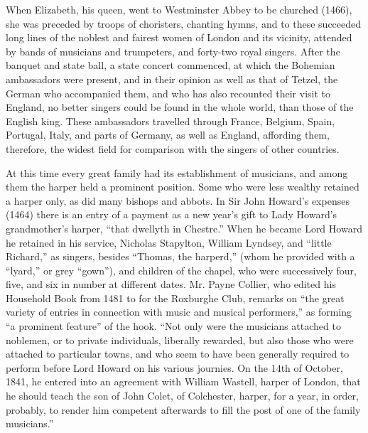 When Elizabeth, his queen, went to Westminster Abbey to be church\-ed (1466),
she was preceded by troops of choristers, chanting hymns, and to these succeeded
long lines of the noblest and fairest women of London and its vicinity, attended by
bands of musicians and trumpeters, and forty-two royal singers. After the banquet
and state ball, a state concert commenced, at which the Bohemian ambassadors
were present, and in their opinion as well as that of Tetzel, the German who accompanied
them, and who has also recounted their visit to England, no better
singers could be found in the whole world, %
than those of the English king.
These ambassadors travelled through France, Belgium, Spain, Portugal, Italy,
and parts of Germany, as well as England, affording them, therefore, the widest
field for comparison with the singers of other countries.

At this time every great family had its establishment of musicians, and among
them the harper held a prominent position. Some who were less wealthy retained
a harper only, as did many bishops and abbots. In Sir John Howard’s expenses
(1464) there is an entry of a payment as a new year’s gift to Lady Howard’s
grandmother’s harper, “that dwellyth in Chestre.” When he became Lord
Howard he retained in his service, Nicholas Stapylton, William Lyndsey, and
“little Richard,” as singers, besides “Thomas, the harperd,” (whom he provided
with a “lyard,” or grey “gown”), and children of the chapel, who were successively
four, five, and six in number at different dates. Mr. Payne Collier, who
edited his Household Book from 1481 to  for the Roxburghe Club, remarks 
on “the great variety of entries in connection with music and musical performers,”
as forming “a prominent feature” of the hook. “Not only were the musicians
attached to noblemen, or to private individuals, liberally rewarded, but also those
who were attached to particular towns, and who seem to have been generally
required to perform before Lord Howard on his various journies. On the 14th of
October, 1841, he entered into an agreement with William Wastell, harper of
London, that he should teach the son of John Colet, of Colchester, harper, for
a year, in order, probably, to render him competent afterwards to fill the post of
one of the family musicians.”

